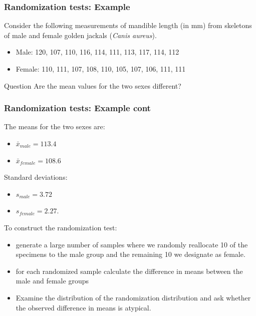 \documentclass{beamer}
\begin{document}
\begin{frame}
  \frametitle{Randomization tests: Example}

Consider the following measurements of mandible length (in mm) from skeletons of male and female golden jackals (\emph{Canis aureus}).

\begin{itemize}
    \item Male: 120, 107, 110, 116, 114, 111, 113, 117, 114, 112
    \item Female: 110, 111, 107, 108, 110, 105, 107, 106, 111, 111
\end{itemize}

\begin{block}{Question}
Are the mean values for the two sexes different?
\end{block}

\end{frame}
\begin{frame}
  \frametitle{Randomization tests: Example cont}

The means for the two sexes are:
\begin{itemize}
    \item $\bar{x}_{male} = 113.4$
    \item $\bar{x}_{female} = 108.6$
\end{itemize}

Standard deviations:
\begin{itemize}
    \item $s_{male} = 3.72$
    \item $s_{female} = 2.27$.
\end{itemize}
\medskip

To construct the randomization test:
\begin{itemize}
    \item generate a large number of samples where we randomly reallocate 10 of the specimens to the male group and the remaining 10 we designate as female.
    \item for each randomized sample calculate the difference in means between the male and female groups
    \item Examine the distribution of the randomization distribution and ask whether the observed difference in means is atypical.

\end{itemize}




\end{frame}
\end{document}
